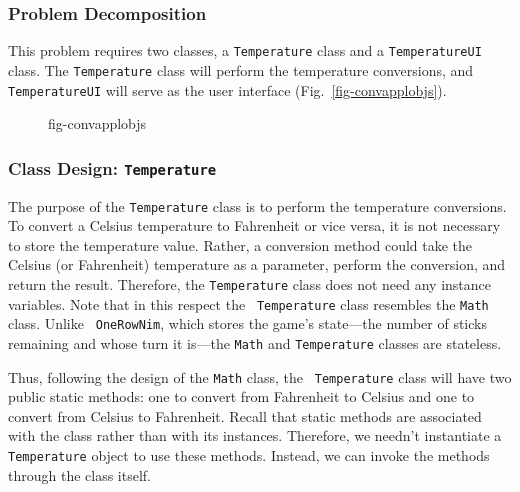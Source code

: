 \subsubsection*{Problem Decomposition}
\noindent This problem requires two classes, a {\tt Temperature} class and a
{\tt TemperatureUI} class.  The {\tt Temperature} class will
perform the temperature conversions, and {\tt TemperatureUI} will
serve as the user interface (Fig.~\ref{fig-convapplobjs}).

\begin{figure}[h]
 {fig-convapplobjs}

\end{figure}

\subsubsection*{Class Design: {\tt Temperature} }
\noindent The purpose of the {\tt Temperature} class is to perform the
temperature conversions.  To convert a Celsius temperature to
Fahrenheit or vice versa, it is not necessary to store the temperature
value.  Rather, a conversion method could take the Celsius (or
Fahrenheit) temperature as a parameter, perform the conversion, and
return the result. Therefore, the {\tt Temperature} class does not
need any instance variables. Note that in this respect the {\tt
Temperature} class resembles the {\tt Math} class. Unlike {\tt
OneRowNim}, which stores the game's state---the number of sticks
remaining and whose turn it is---the {\tt Math} and {\tt Temperature}
classes are stateless.

Thus, following the design of the {\tt Math} class, the {\tt
{}
Temperature} class will have two public static methods:
one to convert from Fahrenheit to Celsius and one to convert from
Celsius to Fahrenheit.  Recall that static methods are associated with
the class rather than with its instances. Therefore, we needn't
instantiate a {\tt Temperature} object to use these methods. Instead,
we can invoke the methods through the class itself.

